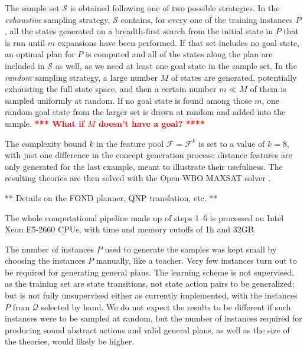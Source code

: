 \documentclass[letterpaper]{article} %
\newcommand{\Q}{\mathcal{Q}}
\renewcommand{\S}{\mathcal{S}}
\begin{document}
The sample set $\mathcal{S}$ is obtained following one of two possible strategies.
In the \emph{exhaustive} sampling strategy,
$\S$ contains, for every one of the training instances $P$,
all the states generated on a breadth-first search from the initial state in $P$
that is run until $m$ expansions have been performed. If that set includes no goal state,
an optimal plan for $P$ is computed and all of the states along the plan are included in $\S$ as well,
as we need at least one goal state in the sample set.
%
In the \emph{random} sampling strategy, a large number $M$ of states are generated, potentially exhausting the full state space,
and then a certain number $m \ll M$ of them is sampled uniformly at random. If no goal state is found among those $m$,
one random goal state from the larger set is drawn at random and added into the sample.
\textcolor{red}{\bf **** What if $M$ doesn't have a goal? ****}

The complexity bound $k$ in the feature pool $\mathcal{F} = \mathcal{F}^k$ is set to a value of $k=8$,
with just one difference in the concept generation process: distance features are only generated for the last example,
meant to illustrate their usefulness.
The resulting theories are then solved with the Open-WBO MAXSAT solver \cite{martins2014open}.

** Details on the FOND planner, QNP translation, etc. **

The whole computational pipeline made up of steps 1--6 is processed on Intel Xeon E5-2660 CPUs,
with time and memory cutoffs of 1h and 32GB.

The number of instances $P$ used to generate the samples was kept small
by choosing the instances $P$ manually, like a teacher.
Very few instances turn out to be required for generating general plans.
The learning scheme is not supervised, as the training set are state
transitions, not state action pairs to be generalized; but is not fully unsupervised either as currently
implemented, with the instances $P$ from $\Q$ selected by hand.
We do not expect the results to be different if such instances
were to be sampled at random, but the number of instances required for
producing sound abstract actions and valid general plans, as well as the size of the
theories, would likely be higher.
\end{document}
